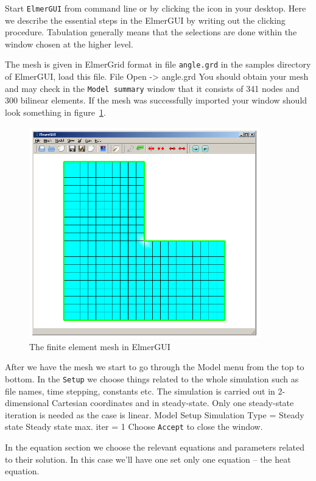 Start \texttt{ElmerGUI} from command line or by clicking the icon in your desktop. Here we describe 
the essential steps in the ElmerGUI by writing out the clicking procedure. Tabulation generally means that the selections are done within the window chosen at the higher level. 

The mesh is given in ElmerGrid format in file \texttt{angle.grd} in the samples directory of ElmerGUI, 
load this file.
\ttbegin
File 
  Open -> angle.grd
\ttend
You should obtain your mesh and may check in the \texttt{Model summary} 
window that it consists of 341 nodes and 300 bilinear elements.
If the mesh was successfully imported your window should look something in figure~\ref{fg:mesh1}.

\begin{figure}
\begin{center}
\includegraphics[width=100mm]{Tangle_mesh}
\caption{The finite element mesh in ElmerGUI}\label{fg:mesh1}
\end{center}
\end{figure}

After we have the mesh we start to go through the Model menu from the top to bottom. 
In the \texttt{Setup} we choose things related to the whole simulation such as file names, 
time stepping, constants etc.
The simulation is carried out in 2-dimensional Cartesian
coordinates and in steady-state. 
Only one steady-state iteration is needed as the case is linear. 
\ttbegin
Model
  Setup 
    Simulation Type = Steady state
    Steady state max. iter = 1
\ttend
Choose \texttt{Accept} to close the window.

In the equation section we choose the relevant equations and parameters related to their solution. 
In this case we'll have one set only one equation -- the heat equation.


